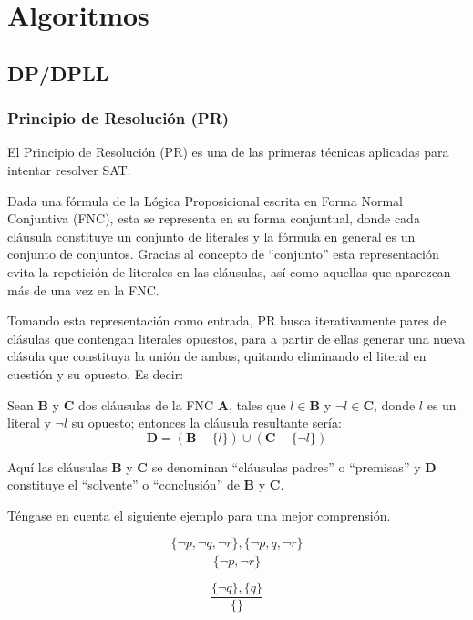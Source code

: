 \chapter{Algoritmos}\label{chapter:algorithms}

\section{DP/DPLL}

\subsection{Principio de Resolución (PR)}
El Principio de Resolución (PR) es una de las primeras técnicas aplicadas para intentar resolver SAT.

Dada una fórmula de la Lógica Proposicional escrita en Forma Normal Conjuntiva (FNC), esta se representa en su forma conjuntual, donde cada cláusula constituye un conjunto de literales y la fórmula en general es un conjunto de conjuntos. Gracias al concepto de ``conjunto'' esta representación evita la repetición de literales en las cláusulas, así como aquellas que aparezcan más de una vez en la FNC. 

Tomando esta representación como entrada, PR busca iterativamente pares de clásulas que contengan literales opuestos, para a partir de ellas generar una nueva clásula que constituya la unión de ambas, quitando eliminando el literal en cuestión y su opuesto. Es decir:

Sean $\textbf{B}$ y $\textbf{C}$ dos cláusulas de la FNC $\textbf{A}$, tales que $l \in \textbf{B}$ y $\neg l \in \textbf{C}$, donde $l$ es un literal y $\neg l$ su opuesto; entonces la cláusula resultante sería:
\begin{equation*}
\textbf{D} = (\textbf{B}-\{l\}) \cup (\textbf{C}-\{\neg l\})
\end{equation*}

Aquí las cláusulas $\textbf{B}$ y $\textbf{C}$ se denominan ``cláusulas padres'' o ``premisas'' y $\textbf{D}$ constituye el ``solvente'' o ``conclusión'' de $\textbf{B}$ y $\textbf{C}$.

Téngase en cuenta el siguiente ejemplo para una mejor comprensión.

\begin{equation*}
\frac{\{\neg p, \neg q, \neg r\},\{\neg p, q, \neg r\}}{\{\neg p, \neg r\}}
\end{equation*}

\begin{equation*}
\frac{\{\neg q\},\{q\}}{\{\}}
\end{equation*}




